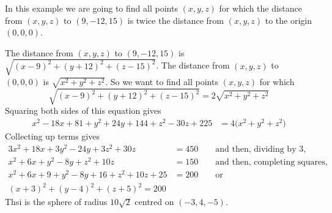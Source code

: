 \begin{eg}
In this example we are going to find all points $(x,y,z)$ for which
the distance from $(x,y,z)$ to $(9,-12,15)$ is twice the distance from $(x,y,z)$   to the origin $(0,0,0)$.

The distance from $(x,y,z)$ to $(9,-12,15)$ is 
$\sqrt{(x-9)^2+(y+12)^2+(z-15)^2}$.
The distance from $(x,y,z)$ to $(0,0,0)$ is 
$\sqrt{x^2+y^2+z^2}$. So we want to find all points $(x,y,z)$ for which
\begin{equation*}
\sqrt{(x-9)^2+(y+12)^2+(z-15)^2}
=2\sqrt{x^2+y^2+z^2}
\end{equation*}
Squaring both sides of this equation gives
\begin{align*}
x^2-18x+81 +y^2+24y+144 +z^2-30z+225 &= 4\big(x^2+y^2+z^2)
\end{align*}
Collecting up terms gives
\begin{align*}
3x^2+18x +3y^2-24y +3z^2+30z &= 450\qquad\text{and then, dividing by $3$,} \\
x^2+6x +y^2-8y +z^2+10z &= 150\qquad\text{and then, completing squares,} \\
x^2+6x +9 +y^2-8y +16  +z^2+10z +25 &= 200\qquad\text{or}\\
(x+3)^2+(y-4)^2+(z+5)^2 =200 
\end{align*}
Thsi is the sphere of radius $10\sqrt{2}$ centred on $(-3,4,-5)$.
\end{eg}

